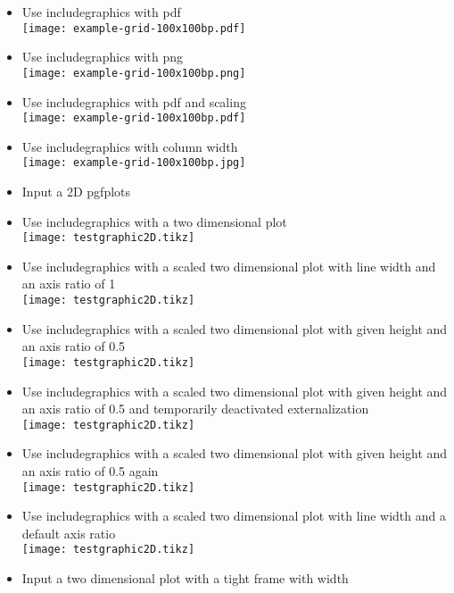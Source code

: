 \documentclass[twocolumn]{article}
\begin{document}
\begin{itemize}
			\item Use includegraphics with pdf\\%
				\texttt{[image: example-grid-100x100bp.pdf]}%
			\item Use includegraphics with png\\%
				\texttt{[image: example-grid-100x100bp.png]}%
			\item Use includegraphics with pdf and scaling\\%
				\texttt{[image: example-grid-100x100bp.pdf]}%
			\item Use includegraphics with column width\\%
				\texttt{[image: example-grid-100x100bp.jpg]}%
			\item Input a 2D pgfplots\\
			\item Use includegraphics with a two dimensional plot\\%
				\texttt{[image: testgraphic2D.tikz]}%
			\item Use includegraphics with a scaled two dimensional plot with line width and an axis ratio of 1\\%
				\texttt{[image: testgraphic2D.tikz]}%
			\item Use includegraphics with a scaled two dimensional plot with given height and an axis ratio of 0.5\\%
				\texttt{[image: testgraphic2D.tikz]}%
			\item Use includegraphics with a scaled two dimensional plot with given height and an axis ratio of 0.5 and temporarily deactivated externalization\\%
				\tikzexternaldisable
				\texttt{[image: testgraphic2D.tikz]}%
				\tikzexternalenable
			\item Use includegraphics with a scaled two dimensional plot with given height and an axis ratio of 0.5 again\\%
				\texttt{[image: testgraphic2D.tikz]}%
			\item Use includegraphics with a scaled two dimensional plot with line width and a default axis ratio\\%
				\texttt{[image: testgraphic2D.tikz]}%
			\item Input a two dimensional plot with a tight frame with width \newlength{\mylen}\settowidth{\mylen}{\frame{}}\the\mylen\\%

\end{itemize}
\end{document}
